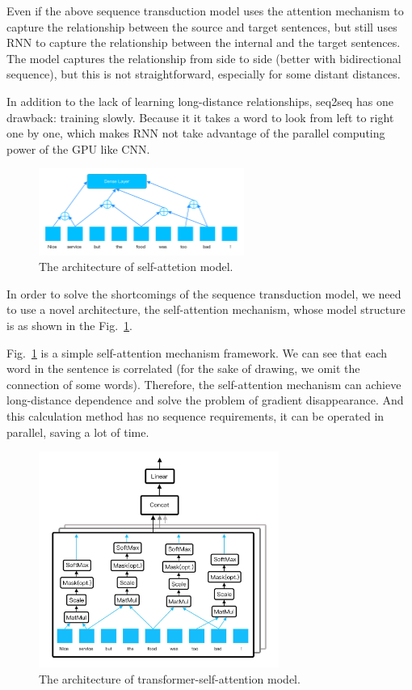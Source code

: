 \documentclass{ieeeaccess}
\begin{document}
Even if the above sequence transduction model uses the attention mechanism to capture the relationship between the source and target sentences, but still uses RNN to capture the relationship between the internal and the target sentences. The model captures the relationship from side to side (better with bidirectional sequence), but this is not straightforward, especially for some distant distances.

In addition to the lack of learning long-distance relationships, seq2seq has one drawback: training slowly. Because it it takes a word to look from left to right one by one, which makes RNN not take advantage of the parallel computing power of the GPU like CNN.

\begin{figure}[htb]
	\centering
	\includegraphics[width=0.6\textwidth]{self-attention2.png}
	\caption{The architecture of self-attetion model.}\label{self-attention}
\end{figure}

In order to solve the shortcomings of the sequence transduction model, we need to use a novel architecture, the self-attention mechanism, whose model structure is as shown in the Fig.~\ref{self-attention}. 

Fig.~\ref{self-attention} is a simple self-attention mechanism framework. We can see that each word in the sentence is correlated (for the sake of drawing, we omit the connection of some words). Therefore, the self-attention mechanism can achieve long-distance dependence and solve the problem of gradient disappearance. And this calculation method has no sequence requirements, it can be operated in parallel, saving a lot of time.

\begin{figure}[htb]
	\centering
	\includegraphics[width=0.7\textwidth]{transformer.jpg}
	\caption{The architecture of transformer-self-attention model.}\label{transfromer}
\end{figure}
\end{document}
